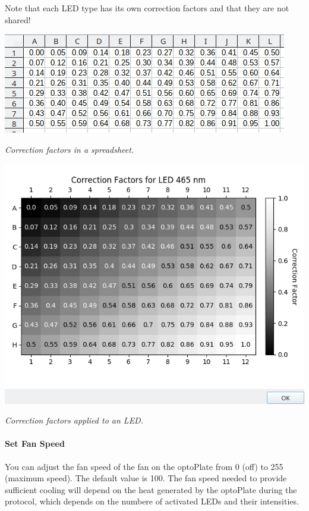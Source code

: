 \begin{itemize}
\begin{itemize}
    Note that each LED type has its own correction factors and that they
    are not shared!

    \includegraphics{images/corr_factors_sheet.jpg}

    \emph{Correction factors in a spreadsheet.}

    \includegraphics{images/corr_factors_show.jpg}

    \emph{Correction factors applied to an LED.}
  \end{itemize}
\end{itemize}

\hypertarget{set-fan-speed}{%
\paragraph{Set Fan Speed}\label{set-fan-speed}}

You can adjust the fan speed of the fan on the optoPlate from 0 (off) to
255 (maximum speed). The default value is 100. The fan speed needed to
provide sufficient cooling will depend on the heat generated by the
optoPlate during the protocol, which depends on the numbere of activated
LEDs and their intensities.

